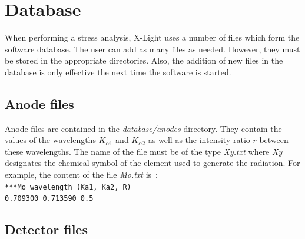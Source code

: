 \documentclass[french,a4paper]{report}
\begin{document}
\section{Database}

When performing a stress analysis, X-Light uses a number of files which form the software database. The user can add as many files as needed. However, they must be stored in the appropriate directories. Also, the addition of new files in the database is only effective the next time the software is started.

\subsection{Anode files}

Anode files are contained in the \textit{database/anodes} directory. They contain the values of the wavelengths $K_{\alpha 1}$ and $K_{\alpha 2}$ as well as the intensity ratio $r$ between these wavelengths. The name of the file must be of the type \textit{Xy.txt} where \textit{Xy} designates the chemical symbol of the element used to generate the radiation. For example, the content of the file \textit{Mo.txt} is~:\\
\texttt{***Mo wavelength (Ka1, Ka2, R)} \\
\texttt{0.709300   0.713590  0.5}

\label{sec_fichieranode}

\subsection{Detector files}
\end{document}
